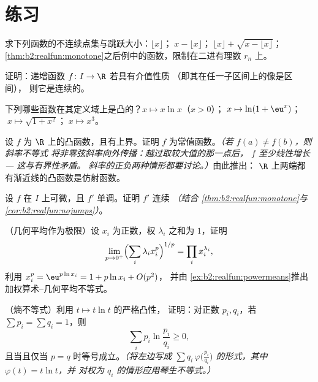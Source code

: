 \section{练习}

\begin{exercise}[$\star$]\label{exo:b2:realfun:1}
求下列函数的不连续点集与跳跃大小：$\lfloor x
\rfloor$；$\;x - \lfloor x\rfloor$；$\;\lfloor x \rfloor + \sqrt{x
- \lfloor x\rfloor}$；
\cref{thm:b2:realfun:monotone}之后例中的函数，限制在二进有理数
$r_n$ 上。
\end{exercise}

\begin{exercise}[$\star$]\label{exo:b2:realfun:2}
证明：递增函数 $f \colon I \to \R$ 若具有介值性质
（即其在任一子区间上的像是区间），
则它是连续的。
\end{exercise}

\begin{exercise}[$\star$]\label{exo:b2:realfun:3}
下列哪些函数在其定义域上是凸的？$x \mapsto
x\ln x$（$x > 0$）；$\;x \mapsto \ln(1 + \eu^x)$；$\;x \mapsto
\sqrt{1 + x^2}$；$\;x \mapsto x^3$。
\end{exercise}

\begin{exercise}[$\star\star$]\label{exo:b2:realfun:4}
设 $f$ 为 $\R$ 上的凸函数，且有上界。证明 $f$
为常值函数。\emph{（若 $f(a) \neq f(b)$，则斜率不等式
将非零弦斜率向外传播：越过取较大值的那一点后，
$f$ 至少线性增长 --- 这与有界性矛盾。
斜率的正负两种情形都要讨论。）}由此推出：
$\R$ 上两端都有渐近线的凸函数是仿射函数。
\end{exercise}

\begin{exercise}[$\star\star$]\label{exo:b2:realfun:5}
设 $f$ 在 $I$ 上可微，且 $f'$ 单调。证明
$f'$ 连续 \emph{（结合
\cref{thm:b2:realfun:monotone}与
\cref{cor:b2:realfun:nojumps}）}。
\end{exercise}

\begin{exercise}[$\star\star$]\label{exo:b2:realfun:6}
（几何平均作为极限）设 $x_i$ 为正数，权
$\lambda_i$ 之和为 $1$，证明
\[
\lim_{p \to 0^+} \Bigl(\sum_i \lambda_i x_i^p\Bigr)^{1/p}
= \prod_i x_i^{\lambda_i} ,
\]
利用 $x_i^p = \eu^{p\ln x_i} = 1 + p\ln x_i + O(p^2)$，
并由
\cref{ex:b2:realfun:powermeans}推出加权算术–几何平均不等式。
\end{exercise}

\begin{exercise}[$\star\star$]\label{exo:b2:realfun:7}
（熵不等式）利用 $t \mapsto t\ln t$ 的严格凸性，
证明：对正数 $p_i, q_i$，若 $\sum p_i = \sum q_i = 1$，则
\[
\sum_i p_i \ln\frac{p_i}{q_i} \geq 0 ,
\]
且当且仅当 $p = q$ 时等号成立。\emph{（将左边写成 $\sum q_i\,
\varphi\bigl(\frac{p_i}{q_i}\bigr)$ 的形式，其中 $\varphi(t) = t\ln t$，并
对权为 $q_i$ 的情形应用琴生不等式。）}
\end{exercise}

